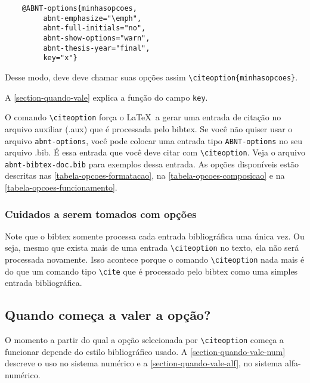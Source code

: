 \documentclass[a4paper]{ltxdoc}
\begin{document}
\begin{verbatim}
    @ABNT-options{minhasopcoes,
         abnt-emphasize="\emph",
         abnt-full-initials="no",
         abnt-show-options="warn",
         abnt-thesis-year="final",
         key="x"}
\end{verbatim}

Desse modo, deve deve chamar suas opções assim \verb+\citeoption{minhasopcoes}+.

A \autoref{section-quando-vale} explica a função do campo {\tt key}.


O comando \verb+\citeoption+ força o \LaTeX\ a gerar uma entrada de citação no
arquivo auxiliar (.aux) que é processada pelo \textsf{bibtex}. Se você não
quiser usar o arquivo {\tt abnt-options}, você pode colocar uma entrada tipo
{\tt ABNT-options} no seu arquivo .bib. É essa entrada que você deve citar com
\verb+\citeoption+. Veja o arquivo {\tt abnt-bibtex-doc.bib} para exemplos dessa
entrada. As opções disponíveis estão descritas nas
\autoref{tabela-opcoes-formatacao}, na \autoref{tabela-opcoes-composicao} e na
\autoref{tabela-opcoes-funcionamento}.

\subsubsection{Cuidados a serem tomados com opções}

Note que o \textsf{bibtex} somente processa cada entrada bibliográfica uma única
vez. Ou seja, mesmo que exista mais de uma entrada \verb+\citeoption+ no texto,
ela não será processada novamente. Isso acontece porque o comando
\verb+\citeoption+ nada mais é do que um comando tipo \verb+\cite+ que é
processado pelo \textsf{bibtex} como uma simples entrada bibliográfica.

\subsection{Quando começa a valer a opção?}
\label{section-quando-vale}

O momento a partir do qual a opção selecionada por \verb+\citeoption+
começa a funcionar depende do estilo bibliográfico usado. A
\autoref{section-quando-vale-num} descreve o uso no sistema numérico e a
\autoref{section-quando-vale-alf}, no sistema alfa-numérico.
\end{document}
